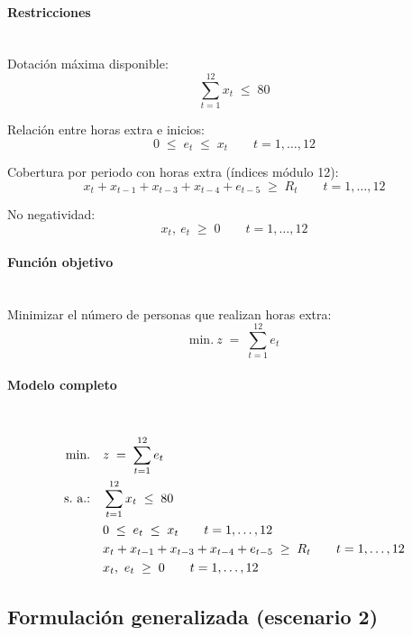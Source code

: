 \paragraph{Restricciones}\mbox{}\\
Dotación máxima disponible:
\begin{equation}
    \sum_{t=1}^{12} x_t \;\leq\; 80
\end{equation}

Relación entre horas extra e inicios:
\begin{equation}
    0 \;\leq\; e_t \;\leq\; x_t \qquad t=1,\dots,12
\end{equation}

Cobertura por periodo con horas extra (índices módulo 12):
\begin{equation}
    x_t + x_{t-1} + x_{t-3} + x_{t-4} + e_{t-5} \;\geq\; R_t \qquad t=1,\dots,12
\end{equation}

No negatividad:
\begin{equation}
    x_t,\ e_t \;\geq\; 0 \qquad t=1,\dots,12
\end{equation}

\paragraph{Función objetivo}\mbox{}\\
Minimizar el número de personas que realizan horas extra:
\begin{equation}
\mbox{min.}\ z \;=\; \sum_{t=1}^{12} e_t
\end{equation}

\paragraph{Modelo completo}\mbox{}\\
\begin{align}
\mbox{min.}\quad & z \;=\; \sum_{t=1}^{12} e_t \notag \\
\mbox{s.\ a.:}\quad 
& \sum_{t=1}^{12} x_t \;\leq\; 80 \notag \\
& 0 \;\leq\; e_t \;\leq\; x_t \qquad t=1,\dots,12 \notag \\
& x_t + x_{t-1} + x_{t-3} + x_{t-4} + e_{t-5} \;\geq\; R_t \qquad t=1,\dots,12 \notag \\
& x_t,\ e_t \;\geq\; 0 \qquad t=1,\dots,12 \notag
\end{align}

\subsection{Formulación generalizada (escenario 2)}

